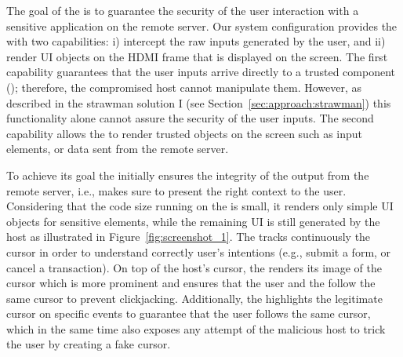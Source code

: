 The goal of the \device is to guarantee the security %
of the user interaction with a sensitive application on the remote server. Our system configuration provides the \device with two capabilities: i) intercept the raw inputs generated by the user, and ii) render UI objects on the HDMI frame that is displayed on the screen. 
The first capability guarantees that the user inputs arrive directly to a trusted component (\device); therefore, the compromised host cannot manipulate them. However, as described in the strawman solution I (see Section~\ref{sec:approach:strawman}) this functionality alone cannot assure the security of the user inputs. The second capability allows the \device to render trusted objects on the screen such as input elements, or data sent from the remote server. 

To achieve its goal the \device initially ensures the integrity of the output from the remote server, i.e., makes sure to present the right context to the user. Considering that the code size running on the \device is small, it renders only simple UI objects for sensitive elements, while the remaining UI is still generated by the host as illustrated in Figure~\ref{fig:screenshot_1}. The \device tracks continuously the cursor in order to understand correctly user's intentions (e.g., submit a form, or cancel a transaction). On top of the host's cursor, the \device renders its image of the cursor which is more prominent and ensures that the user and the \device follow the same cursor to prevent clickjacking. Additionally, the \device highlights the legitimate cursor on specific events to guarantee that the user follows the same cursor, which in the same time also exposes any attempt of the malicious host to trick the user by creating a fake cursor. %

